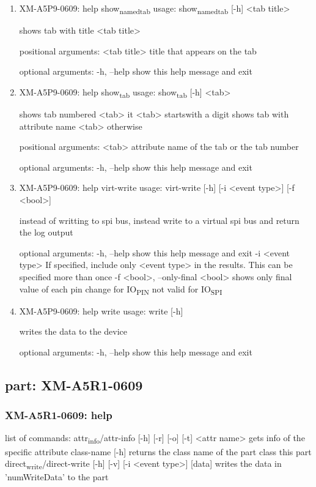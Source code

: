 \documentclass[11pt]{article}
\begin{document}
\begin{enumerate}
\item XM-A5P9-0609: help show\textsubscript{named}\textsubscript{tab}
\label{sec:orge18a3c1}
usage: show\textsubscript{named}\textsubscript{tab} [-h] <tab title>

shows tab with title <tab title>

positional arguments:
  <tab title>  title that appears on the tab

optional arguments:
  -h, --help   show this help message and exit

\item XM-A5P9-0609: help show\textsubscript{tab}
\label{sec:org325c79b}
usage: show\textsubscript{tab} [-h] <tab>

shows tab numbered <tab> it <tab> startswith a digit shows tab with attribute
name <tab> otherwise

positional arguments:
  <tab>       attribute name of the tab or the tab number

optional arguments:
  -h, --help  show this help message and exit

\item XM-A5P9-0609: help virt-write
\label{sec:orga42091d}
usage: virt-write [-h] [-i <event type>] [-f <bool>]

instead of writting to spi bus, instead write to a virtual spi bus and return
the log output

optional arguments:
  -h, --help            show this help message and exit
  -i <event type>       If specified, include only <event type> in the
                        results. This can be specified more than once
  -f <bool>, --only-final <bool>
                        shows only final value of each pin change for IO\textsubscript{PIN}
                        not valid for IO\textsubscript{SPI}

\item XM-A5P9-0609: help write
\label{sec:org6891db1}
usage: write [-h]

writes the data to the device

optional arguments:
  -h, --help  show this help message and exit
\end{enumerate}

\subsection{part: XM-A5R1-0609}
\label{sec:org897f9a1}
\subsubsection{XM-A5R1-0609: help}
\label{sec:org8b8afc6}
list of commands:
  attr\textsubscript{info}/attr-info [-h] [-r] [-o] [-t] <attr name>
    gets info of the specific attribute
  class-name [-h]
    returns the class name of the part class this part
  direct\textsubscript{write}/direct-write [-h] [-v] [-i <event type>] [data]
    writes the data in 'numWriteData' to the part
\end{document}
